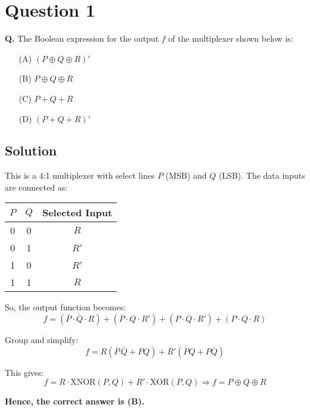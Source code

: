 \documentclass{article}
\begin{document}
\section*{Question 1}

\textbf{Q.} The Boolean expression for the output $f$ of the multiplexer shown below is:

\begin{itemize}
  \item[(A)] $(P \oplus Q \oplus R)'$
  \item[(B)] $P \oplus Q \oplus R$
  \item[(C)] $P + Q + R$
  \item[(D)] $(P + Q + R)'$
\end{itemize}

\subsection*{Solution}

This is a 4:1 multiplexer with select lines $P$ (MSB) and $Q$ (LSB). The data inputs are connected as:

\begin{center}
\begin{tabular}{cc|c}
\toprule
$P$ & $Q$ & Selected Input \\
\midrule
0 & 0 & $R$ \\
0 & 1 & $R'$ \\
1 & 0 & $R'$ \\
1 & 1 & $R$ \\
\bottomrule
\end{tabular}
\end{center}

So, the output function becomes:
\[
f = (\overline{P} \cdot \overline{Q} \cdot R) + (\overline{P} \cdot Q \cdot R') + (P \cdot \overline{Q} \cdot R') + (P \cdot Q \cdot R)
\]

Group and simplify:
\[
f = R(\overline{P}\,\overline{Q} + P Q) + R'(\overline{P} Q + P \overline{Q})
\]

This gives:
\[
f = R \cdot \text{XNOR}(P, Q) + R' \cdot \text{XOR}(P, Q)
\Rightarrow f = P \oplus Q \oplus R
\]

\textbf{Hence, the correct answer is (B).}
\end{document}

